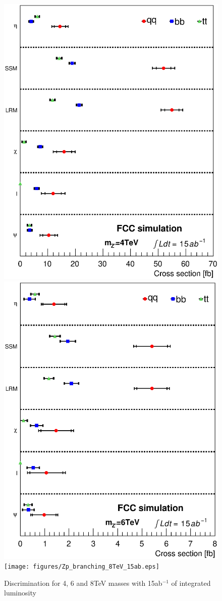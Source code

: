 \documentclass[14pt]{article}
\begin{document}
\begin{figure}[h]
  \centering
    \includegraphics[width=0.45\columnwidth]{figures/Zp_branching_4TeV_15ab.eps}
    \includegraphics[width=0.45\columnwidth]{figures/Zp_branching_6TeV_15ab.eps}
    \texttt{[image: figures/Zp\_branching\_8TeV\_15ab.eps]}
  \caption{Discrimination for 4, 6 and 8TeV masses with 15ab$^{-1}$ of integrated luminosity}
  \label{figure:hadana:discri15ab}
\end{figure}
\end{document}
